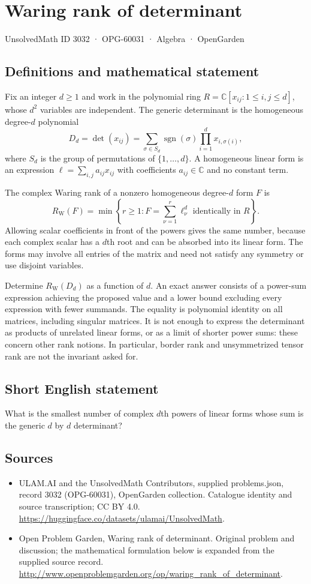 \documentclass[11pt,a4paper]{article}
\begin{document}
\section*{Waring rank of determinant}\label{3032}
{\small UnsolvedMath ID 3032 · OPG-60031 · Algebra · OpenGarden}
\subsection{Definitions and mathematical statement}
Fix an integer $d\ge1$ and work in the polynomial ring
$R=\mathbb C[x_{ij}:1\le i,j\le d]$, whose $d^2$ variables are independent.
The generic determinant is the homogeneous degree-$d$ polynomial
\[
 D_d=\det(x_{ij})=
 \sum_{\sigma\in S_d}\operatorname{sgn}(\sigma)
       \prod_{i=1}^d x_{i,\sigma(i)},
\]
where $S_d$ is the group of permutations of $\{1,\ldots,d\}$.
A homogeneous linear form is an expression
$\ell=\sum_{i,j}a_{ij}x_{ij}$ with coefficients $a_{ij}\in\mathbb C$ and no
constant term.

The complex Waring rank of a nonzero homogeneous degree-$d$ form $F$ is
\[
 R_{\mathrm W}(F)=\min\left\{r\ge1:
 F=\sum_{\nu=1}^r\ell_\nu^d\text{ identically in }R\right\}.
\]
Allowing scalar coefficients in front of the powers gives the same number,
because each complex scalar has a $d$th root and can be absorbed into its
linear form. The forms may involve all entries of the matrix and need not
satisfy any symmetry or use disjoint variables.

Determine $R_{\mathrm W}(D_d)$ as a function of $d$. An exact answer consists
of a power-sum expression achieving the proposed value and a lower bound
excluding every expression with fewer summands. The equality is polynomial
identity on all matrices, including singular matrices. It is not enough to
express the determinant as products of unrelated linear forms, or as a
limit of shorter power sums: these concern other rank notions. In particular,
border rank and unsymmetrized tensor rank are not the invariant asked for.
\subsection{Short English statement}
What is the smallest number of complex $d$th powers of linear forms whose sum is the generic $d$ by $d$ determinant?
\subsection{Sources}
\begin{itemize}
\item[S1] ULAM.AI and the UnsolvedMath Contributors, supplied problems.json, record 3032 (OPG-60031), OpenGarden collection. Catalogue identity and source transcription; CC BY 4.0.
\url{https://huggingface.co/datasets/ulamai/UnsolvedMath}.
\item[S2] Open Problem Garden, Waring rank of determinant. Original problem and discussion; the mathematical formulation below is expanded from the supplied source record.
\url{http://www.openproblemgarden.org/op/waring_rank_of_determinant}.
\end{itemize}
\end{document}
